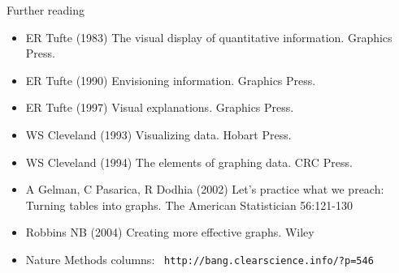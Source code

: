 \documentclass[12pt]{article}
\newcommand{\headsize}{\fontsize{35}{35} \selectfont}
\newcommand{\smallestsize}{\fontsize{18}{22} \selectfont}
\begin{document}
\newpage


\headsize \color{yellow}
\hfill \begin{minipage}{5.75in}
\centering
Further reading
\end{minipage}

\vspace{30mm}
\smallestsize \color{white}

\hspace{0.5in} \begin{minipage}[t]{9in}
\begin{itemize}

\itemsep12pt

\item ER Tufte (1983) The visual display of quantitative information.
Graphics Press.
\item ER Tufte (1990) Envisioning information. Graphics Press.
\item ER Tufte (1997) Visual explanations. Graphics Press.

\vspace*{8mm}

\item WS Cleveland (1993) Visualizing data. Hobart Press.
\item WS Cleveland (1994) The elements of graphing data. CRC Press.

\vspace*{8mm}

\item A Gelman, C Pasarica, R Dodhia (2002) Let's practice what we preach:
Turning tables into graphs. The American Statistician 56:121-130

\vspace*{8mm}

\item Robbins NB (2004) Creating more effective graphs. Wiley

\vspace*{8mm}

\item Nature Methods columns: {\tt \color{blue} http://bang.clearscience.info/?p=546}

\end{itemize}
\end{minipage}
\end{document}
